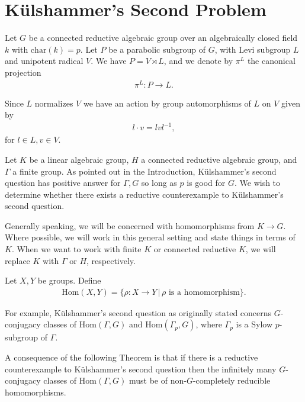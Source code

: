
\chapter{K\"ulshammer's Second Problem}
\label{Chapter4}

Let $G$ be a connected reductive algebraic group over an algebraically closed field $k$ with $\mathrm{char}(k) = p$. Let $P$ be a parabolic subgroup of $G$, with Levi subgroup $L$ and unipotent radical $V$. We have $P = V \rtimes L$, and we denote by $\pi^L$ the canonical projection
\begin{align*} \pi^L:P \rightarrow L. \end{align*}

Since $L$ normalizes $V$ we have an action by group automorphisms of $L$ on $V$ given by
\begin{align} \label{laction} l \cdot v = lvl^{-1}, \end{align}
for $l \in L, v \in V$.

Let $K$ be a linear algebraic group, $H$ a connected reductive algebraic group, and $\Gamma$ a finite group.
As pointed out in the Introduction, K\"ulshammer's second question has positive answer for $\Gamma, G$ so long as $p$ is good for $G$. We wish to determine whether there exists a reductive counterexample to K\"ulshammer's second question.


Generally speaking, we will be concerned with homomorphisms from $K \rightarrow G$. Where possible, we will work in this general setting and state things in terms of $K$. When we want to work with finite $K$ or connected reductive $K$, we will replace $K$ with $\Gamma$ or $H$, respectively.

\begin{definition} Let $X,Y$ be groups. Define
\begin{align*} \mathrm{Hom}(X, Y) = \{ \rho : X \rightarrow Y \,|\, \rho \textrm{ is a homomorphism}\}. 
\end{align*}
\end{definition}

For example, K\"ulshammer's second question as originally stated concerns $G$-conjugacy classes of $\mathrm{Hom}(\Gamma, G)$ and $\mathrm{Hom}(\Gamma_p, G)$, where $\Gamma_p$ is a Sylow $p$-subgroup of $\Gamma$.


A consequence of the following Theorem \cite[Theorem 1.2]{martin2003reductive} is that if there is a reductive counterexample to K\"ulshammer's second question then the infinitely many $G$-conjugacy classes of $\mathrm{Hom}(\Gamma, G)$ must be of non-$G$-completely reducible homomorphisms.

